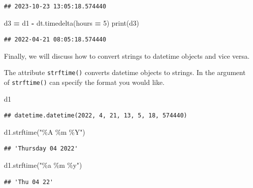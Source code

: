 \documentclass[
]{book}
\newenvironment{Shaded}{\begin{snugshade}}{\end{snugshade}}
\newcommand{\BuiltInTok}[1]{#1}
\newcommand{\DecValTok}[1]{\textcolor[rgb]{0.00,0.00,0.81}{#1}}
\newcommand{\NormalTok}[1]{#1}
\newcommand{\OperatorTok}[1]{\textcolor[rgb]{0.81,0.36,0.00}{\textbf{#1}}}
\newcommand{\StringTok}[1]{\textcolor[rgb]{0.31,0.60,0.02}{#1}}
\begin{document}
\begin{verbatim}
## 2023-10-23 13:05:18.574440
\end{verbatim}

\begin{Shaded}
\begin{Highlighting}[]
\NormalTok{d3 }\OperatorTok{=}\NormalTok{ d1 }\OperatorTok{{-}}\NormalTok{ dt.timedelta(hours }\OperatorTok{=} \DecValTok{5}\NormalTok{)}
\BuiltInTok{print}\NormalTok{(d3)}
\end{Highlighting}
\end{Shaded}

\begin{verbatim}
## 2022-04-21 08:05:18.574440
\end{verbatim}

Finally, we will discuss how to convert strings to datetime objects and vice versa.

The attribute \texttt{strftime()} converts datetime objects to strings. In the argument of \texttt{strftime()} can specify the format you would like.

\begin{Shaded}
\begin{Highlighting}[]
\NormalTok{d1}
\end{Highlighting}
\end{Shaded}

\begin{verbatim}
## datetime.datetime(2022, 4, 21, 13, 5, 18, 574440)
\end{verbatim}

\begin{Shaded}
\begin{Highlighting}[]
\NormalTok{d1.strftime(}\StringTok{"\%A \%m \%Y"}\NormalTok{)}
\end{Highlighting}
\end{Shaded}

\begin{verbatim}
## 'Thursday 04 2022'
\end{verbatim}

\begin{Shaded}
\begin{Highlighting}[]
\NormalTok{d1.strftime(}\StringTok{"\%a \%m \%y"}\NormalTok{)}
\end{Highlighting}
\end{Shaded}

\begin{verbatim}
## 'Thu 04 22'
\end{verbatim}
\end{document}
